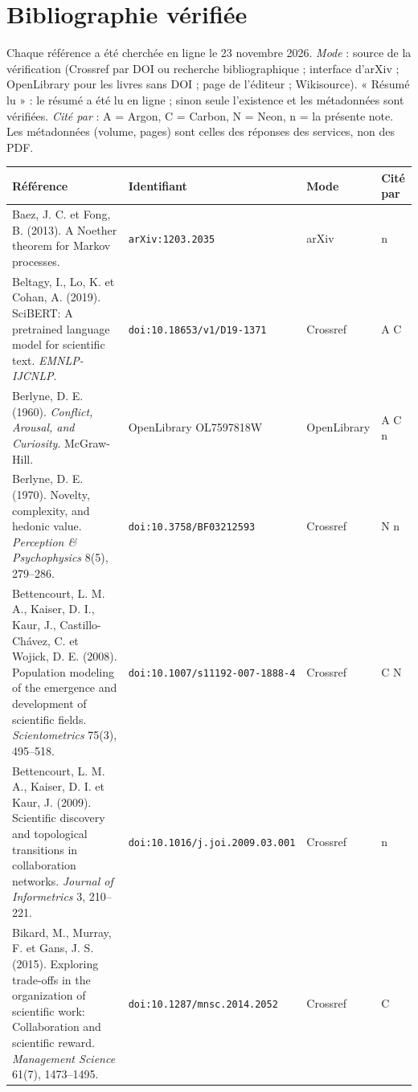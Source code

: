 \documentclass[a4paper,11pt]{article}
\begin{document}
\section*{Bibliographie vérifiée}
Chaque référence a été cherchée en ligne le 23 novembre 2026. \emph{Mode} : source de la vérification (Crossref par DOI ou recherche bibliographique ; interface d'arXiv ; OpenLibrary pour les livres sans DOI ; page de l'éditeur ; Wikisource). « Résumé lu » : le résumé a été lu en ligne ; sinon seule l'existence et les métadonnées sont vérifiées. \emph{Cité par} : A = Argon, C = Carbon, N = Neon, n = la présente note. Les métadonnées (volume, pages) sont celles des réponses des services, non des PDF.
{\footnotesize\renewcommand{\arraystretch}{1.1}
\begin{longtable}{@{}>{\raggedright\arraybackslash}p{8.7cm}>{\raggedright\arraybackslash}p{3.6cm}>{\raggedright\arraybackslash}p{2.1cm}>{\raggedright\arraybackslash}p{0.9cm}@{}}
\toprule \textbf{Référence} & \textbf{Identifiant} & \textbf{Mode} & \textbf{Cité par}\\ \midrule\endhead \bottomrule\endfoot
Baez, J. C. et Fong, B. (2013). A Noether theorem for Markov processes. & \nolinkurl{arXiv:1203.2035} & arXiv & n\\
Beltagy, I., Lo, K. et Cohan, A. (2019). SciBERT: A pretrained language model for scientific text. \emph{EMNLP-IJCNLP}. & \nolinkurl{doi:10.18653/v1/D19-1371} & Crossref & A C\\
Berlyne, D. E. (1960). \emph{Conflict, Arousal, and Curiosity}. McGraw-Hill. & OpenLibrary OL7597818W & OpenLibrary & A C n\\
Berlyne, D. E. (1970). Novelty, complexity, and hedonic value. \emph{Perception \& Psychophysics} 8(5), 279--286. & \nolinkurl{doi:10.3758/BF03212593} & Crossref & N n\\
Bettencourt, L. M. A., Kaiser, D. I., Kaur, J., Castillo-Chávez, C. et Wojick, D. E. (2008). Population modeling of the emergence and development of scientific fields. \emph{Scientometrics} 75(3), 495--518. & \nolinkurl{doi:10.1007/s11192-007-1888-4} & Crossref & C N\\
Bettencourt, L. M. A., Kaiser, D. I. et Kaur, J. (2009). Scientific discovery and topological transitions in collaboration networks. \emph{Journal of Informetrics} 3, 210--221. & \nolinkurl{doi:10.1016/j.joi.2009.03.001} & Crossref & n\\
Bikard, M., Murray, F. et Gans, J. S. (2015). Exploring trade-offs in the organization of scientific work: Collaboration and scientific reward. \emph{Management Science} 61(7), 1473--1495. & \nolinkurl{doi:10.1287/mnsc.2014.2052} & Crossref & C\\

\end{longtable}}
\end{document}
